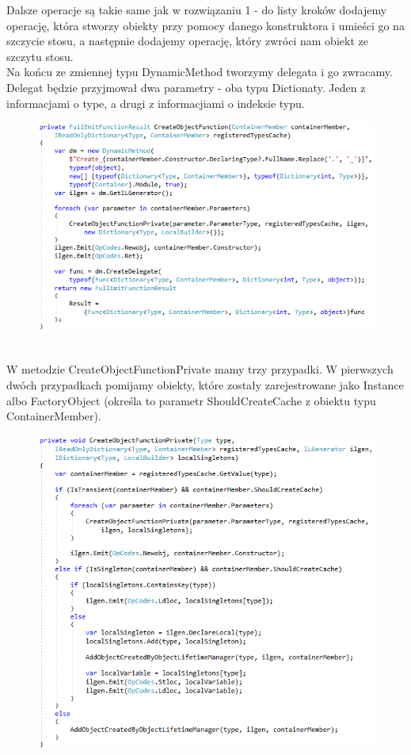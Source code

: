 \documentclass[12pt]{article}
\begin{document}
Dalsze operacje są takie same jak w rozwiązaniu 1 - do listy kroków dodajemy operację, która stworzy obiekty przy pomocy danego konstruktora i umieści go na szczycie stosu, a następnie dodajemy operację, który zwróci nam obiekt ze szczytu stosu.\\
Na końcu ze zmiennej typu DynamicMethod tworzymy delegata i go zwracamy. Delegat będzie przyjmował dwa parametry - oba typu Dictionaty. Jeden z informacjami o type, a drugi z informacjiami o indeksie typu.
\begin{figure}[h]
	\begin{raggedleft}
  		\includegraphics{FullEmitFunction_CreateObjectFunction.png}
	\end{raggedleft}
\end{figure}\\
W metodzie CreateObjectFunctionPrivate mamy trzy przypadki. W pierwszych dwóch przypadkach pomijamy obiekty, które zostały zarejestrowane jako Instance albo FactoryObject (określa to parametr ShouldCreateCache z obiektu typu ContainerMember).
\begin{figure}[h]
	\begin{raggedleft}
  		\includegraphics{FullEmitFunction_CreateObjectFunctionPrivate.png}
	\end{raggedleft}
\end{figure}\\
\end{document}
